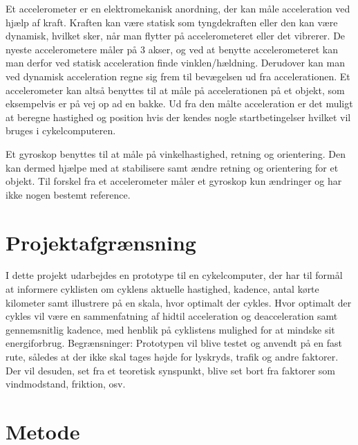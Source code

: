 Et accelerometer er en elektromekanisk anordning, der kan måle acceleration ved hjælp af kraft. Kraften kan være statisk som tyngdekraften eller den kan være dynamisk, hvilket sker, når man flytter på accelerometeret eller det vibrerer. De nyeste accelerometere måler på 3 akser, og ved at benytte accelerometeret kan man derfor ved statisk acceleration finde vinklen/hældning. Derudover kan man ved dynamisk acceleration regne sig frem til bevægelsen ud fra accelerationen. Et accelerometer kan altså benyttes til at måle på accelerationen på et objekt, som eksempelvis er på vej op ad en bakke. Ud fra den målte acceleration er det muligt at beregne hastighed og position hvis der kendes nogle startbetingelser hvilket vil bruges i cykelcomputeren. 

Et gyroskop benyttes til at måle på vinkelhastighed, retning og orientering. Den kan dermed hjælpe med at stabilisere samt ændre retning og orientering for et objekt. Til forskel fra et accelerometer måler et gyroskop kun ændringer og har ikke nogen bestemt reference.

\section{Projektafgrænsning}
I dette projekt udarbejdes en prototype til en cykelcomputer, der har til formål at informere cyklisten om cyklens aktuelle hastighed, kadence, antal kørte kilometer samt illustrere på en skala, hvor optimalt der cykles.
Hvor optimalt der cykles vil være en sammenfatning af hidtil acceleration og deacceleration samt gennemsnitlig kadence, med henblik på cyklistens mulighed for at mindske sit energiforbrug.
Begrænsninger:
Prototypen vil blive testet og anvendt på en fast rute, således at der ikke skal tages højde for lyskryds, trafik og andre faktorer. Der vil desuden, set fra et teoretisk synspunkt, blive set bort fra faktorer som vindmodstand, friktion, osv.

\section{Metode}


